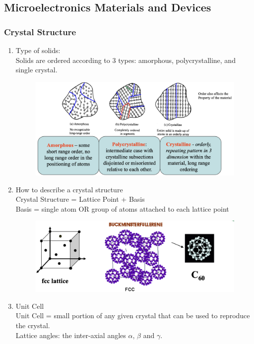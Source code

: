\subsection{Microelectronics Materials and Devices}
\subsubsection{Crystal Structure}
\begin{enumerate}
    \item Type of solids: \\
    Solids are ordered according to 3 types: amorphous, polycrystalline, and single crystal.
    \begin{figure}[h]
        \centering
        \includegraphics[width=0.75\linewidth]{image/crstal.png}
    \end{figure}
    \item How to describe a crystal structure\\
    Crystal Structure = Lattice Point + Basis \\
    Basis = single atom OR group of atoms attached to each lattice point \\
    \begin{figure}[h]
        \centering
        \includegraphics[width=0.8\linewidth]{image/latticestructure.png}
    \end{figure}
    \item Unit Cell \\
    Unit Cell = small portion of any given crystal that can be used to reproduce the crystal. \\
    Lattice angles: the inter-axial angles $\alpha$, $\beta$ and $\gamma$. \\

\end{enumerate}
